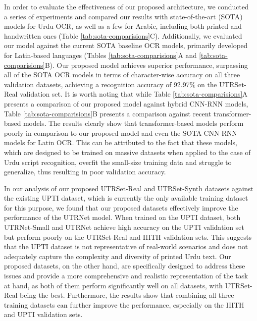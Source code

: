 \documentclass[runningheads]{llncs}
\newcommand{\ModelName}{{UTRNet}\xspace}
\newcommand{\DatasetNameReal}{{UTRSet-Real}\xspace}
\newcommand{\DatasetNameSynth}{{UTRSet-Synth}\xspace}
\begin{document}
In order to evaluate the effectiveness of our proposed architecture, we conducted a series of experiments and compared our results with state-of-the-art (SOTA) models for Urdu OCR, as well as a few for Arabic, including both printed and handwritten ones (Table \ref{tab:sota-comparisions}C). Additionally, we evaluated our model against the current SOTA baseline OCR models, primarily developed for Latin-based languages (Tables \ref{tab:sota-comparisions}A and \ref{tab:sota-comparisions}B). Our proposed model achieves superior performance, surpassing all of the SOTA OCR models in terms of character-wise accuracy on all three validation datasets, achieving a recognition accuracy of 92.97\% on the \DatasetNameReal validation set. It is worth noting that while Table \ref{tab:sota-comparisions}A presents a comparison of our proposed model against hybrid CNN-RNN models, Table \ref{tab:sota-comparisions}B presents a comparison against recent transformer-based models. The results clearly show that transformer-based models perform poorly in comparison to our proposed model and even the SOTA CNN-RNN models for Latin OCR. This can be attributed to the fact that these models, which are designed to be trained on massive datasets when applied to the case of Urdu script recognition, overfit the small-size training data and struggle to generalize, thus resulting in poor validation accuracy.

In our analysis of our proposed \DatasetNameReal and \DatasetNameSynth datasets against the existing UPTI dataset, which is currently the only available training dataset for this purpose, we found that our proposed datasets effectively improve the performance of the \ModelName model. When trained on the UPTI dataset, both \ModelName-Small and \ModelName achieve high accuracy on the UPTI validation set but perform poorly on the UTRSet-Real and IIITH validation sets. This suggests that the UPTI dataset is not representative of real-world scenarios and does not adequately capture the complexity and diversity of printed Urdu text. Our proposed datasets, on the other hand, are specifically designed to address these issues and provide a more comprehensive and realistic representation of the task at hand, as both of them perform significantly well on all datasets, with \DatasetNameReal being the best. Furthermore, the results show that combining all three training datasets can further improve the performance, especially on the IIITH and UPTI validation sets.
\end{document}
